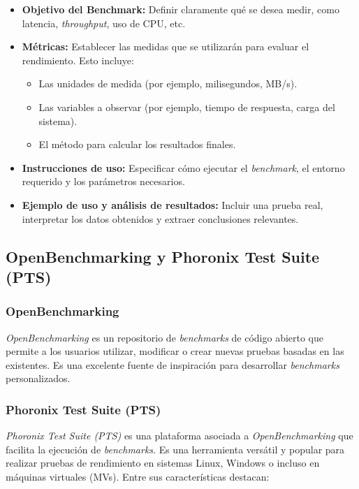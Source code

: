 \begin{itemize}
    \item \textbf{Objetivo del Benchmark:} Definir claramente qué se desea medir, como latencia, \textit{throughput}, uso de CPU, etc.
    \item \textbf{Métricas:} Establecer las medidas que se utilizarán para evaluar el rendimiento. Esto incluye:
    \begin{itemize}
        \item Las unidades de medida (por ejemplo, milisegundos, MB/s).
        \item Las variables a observar (por ejemplo, tiempo de respuesta, carga del sistema).
        \item El método para calcular los resultados finales.
    \end{itemize}
    \item \textbf{Instrucciones de uso:} Especificar cómo ejecutar el \textit{benchmark}, el entorno requerido y los parámetros necesarios.
    \item \textbf{Ejemplo de uso y análisis de resultados:} Incluir una prueba real, interpretar los datos obtenidos y extraer conclusiones relevantes.
\end{itemize}

\subsection{OpenBenchmarking y Phoronix Test Suite (PTS)}

\subsubsection{OpenBenchmarking}

\textit{OpenBenchmarking} es un repositorio de \textit{benchmarks} de código abierto que permite a los usuarios utilizar, modificar o crear nuevas pruebas basadas en las existentes. Es una excelente fuente de inspiración para desarrollar \textit{benchmarks} personalizados.

\subsubsection{Phoronix Test Suite (PTS)}

\textit{Phoronix Test Suite (PTS)} es una plataforma asociada a \textit{OpenBenchmarking} que facilita la ejecución de \textit{benchmarks}. Es una herramienta versátil y popular para realizar pruebas de rendimiento en sistemas Linux, Windows o incluso en máquinas virtuales (MVs). Entre sus características destacan:

